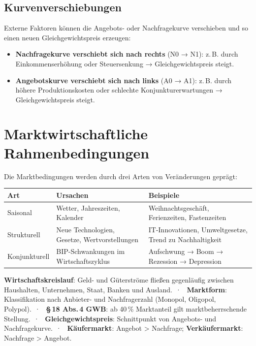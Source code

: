 \documentclass[11pt, a4paper]{article}
\begin{document}
\subsection{Kurvenverschiebungen}

Externe Faktoren können die Angebots- oder Nachfragekurve verschieben und so einen neuen
Gleichgewichtspreis erzeugen:

\begin{itemize}
  \item \textbf{Nachfragekurve verschiebt sich nach rechts} (N0 → N1): z.\,B. durch
        Einkommenserhöhung oder Steuersenkung → Gleichgewichtspreis steigt.
  \item \textbf{Angebotskurve verschiebt sich nach links} (A0 → A1): z.\,B. durch höhere
        Produktionskosten oder schlechte Konjunkturerwartungen → Gleichgewichtspreis steigt.
\end{itemize}

\section{Marktwirtschaftliche Rahmenbedingungen}

Die Marktbedingungen werden durch drei Arten von Veränderungen geprägt:

\begin{center}
\begin{tabular}{p{3cm} p{5cm} p{5cm}}
\toprule
\textbf{Art} & \textbf{Ursachen} & \textbf{Beispiele}\\
\midrule
Saisonal & Wetter, Jahreszeiten, Kalender & Weihnachtsgeschäft, Ferienzeiten, Fastenzeiten\\
\addlinespace
Strukturell & Neue Technologien, Gesetze, Wertvorstellungen & IT-Innovationen, Umweltgesetze, Trend zu Nachhaltigkeit\\
\addlinespace
Konjunkturell & BIP-Schwankungen im Wirtschaftszyklus & Aufschwung → Boom → Rezession → Depression\\
\bottomrule
\end{tabular}
\end{center}

\begin{merksatz}[title={\bfseries Zusammenfassung: Kernbegriffe dieser Session}]
\textbf{Wirtschaftskreislauf}: Geld- und Güterströme fließen gegenläufig zwischen Haushalten,
Unternehmen, Staat, Banken und Ausland.~·~
\textbf{Marktform}: Klassifikation nach Anbieter- und Nachfragerzahl (Monopol, Oligopol,
Polypol).~·~
\textbf{§\,18 Abs.\,4 GWB}: ab 40\,\% Marktanteil gilt marktbeherrschende Stellung.~·~
\textbf{Gleichgewichtspreis}: Schnittpunkt von Angebots- und Nachfragekurve.~·~
\textbf{Käufermarkt}: Angebot > Nachfrage; \textbf{Verkäufermarkt}: Nachfrage > Angebot.
\end{merksatz}
\end{document}
